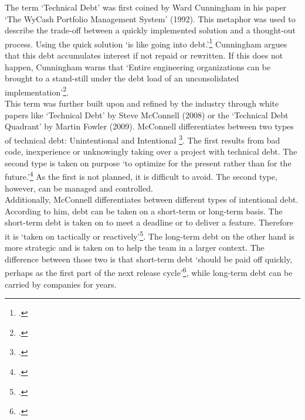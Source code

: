 The term `Technical Debt' was first coined by Ward Cunningham in his paper `The WyCash Portfolio Management System' (1992). This metaphor was used to describe the trade-off between a quickly implemented solution and a thought-out process. 
Using the quick solution `is like going into debt.'\footcite[2]{cunninghamWyCashPortfolioManagement1992} Cunningham argues that this debt accumulates interest if not repaid or rewritten. 
If this does not happen, Cunningham warns that `Entire engineering organizations can be brought to a stand-still under the debt load of an unconsolidated implementation'\footcite[2]{cunninghamWyCashPortfolioManagement1992}.\\

This term was further built upon and refined by the industry through white papers like `Technical Debt' by Steve McConnell (2008) or the `Technical Debt Quadrant' by Martin Fowler (2009).
McConnell differentiates between two types of technical debt: Unintentional and Intentional \footcite[3]{mcconnellManagingTechnicalDebt2017}. The first results from bad code, inexperience or unknowingly taking over a project with technical debt.
The second type is taken on purpose `to optimize for the present rather than for the future.'\footcite[3]{mcconnellManagingTechnicalDebt2017} As the first is not planned, it is difficult to avoid. The second type, however, can be managed and controlled.\\
Additionally, McConnell differentiates between different types of intentional debt. According to him, debt can be taken on a short-term or long-term basis. The short-term debt is taken on to meet a deadline or to deliver a feature. Therefore it is `taken on tactically or reactively'\footcite[3]{mcconnellManagingTechnicalDebt2017}.
The long-term debt on the other hand is more strategic and is taken on to help the team in a larger context. The difference between those two is that short-term debt `should be paid off quickly, perhaps as the first part of the next release cycle'\footcite[4]{mcconnellManagingTechnicalDebt2017}, while 
long-term debt can be carried by companies for years.\\

